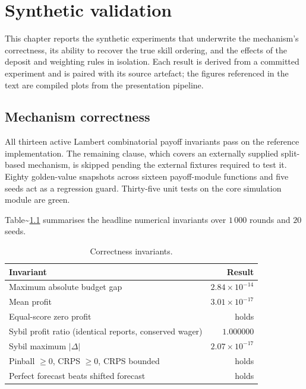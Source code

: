 \documentclass[
  11pt,
  a4paper,
  oneside]{report}
\begin{document}
\chapter{Synthetic validation}\label{ch:synthetic}

This chapter reports the synthetic experiments that underwrite the
mechanism's correctness, its ability to recover the true skill ordering,
and the effects of the deposit and weighting rules in isolation. Each
result is derived from a committed experiment and is paired with its
source artefact; the figures referenced in the text are compiled plots
from the presentation pipeline.

\section{Mechanism correctness}\label{mechanism-correctness}

All thirteen active Lambert combinatorial payoff invariants pass on the
reference implementation. The remaining clause, which covers an
externally supplied split-based mechanism, is skipped pending the
external fixtures required to test it. Eighty golden-value snapshots
across sixteen payoff-module functions and five seeds act as a
regression guard. Thirty-five unit tests on the core simulation module
are green.

Table\textasciitilde{}\ref{tab:correctness} summarises the headline
numerical invariants over \(1\,000\) rounds and \(20\) seeds.

\begin{table}[h]
\centering
\small
\begin{tabular}{lr}
\toprule
Invariant & Result \\
\midrule
Maximum absolute budget gap & $2.84 \times 10^{-14}$ \\
Mean profit & $3.01 \times 10^{-17}$ \\
Equal-score zero profit & holds \\
Sybil profit ratio (identical reports, conserved wager)
  & $1.000000$ \\
Sybil maximum $|\Delta|$ & $2.07 \times 10^{-17}$ \\
Pinball $\geq 0$, CRPS $\geq 0$, CRPS bounded & holds \\
Perfect forecast beats shifted forecast & holds \\
\bottomrule
\end{tabular}
\caption{Correctness invariants.}
\label{tab:correctness}
\end{table}
\end{document}
